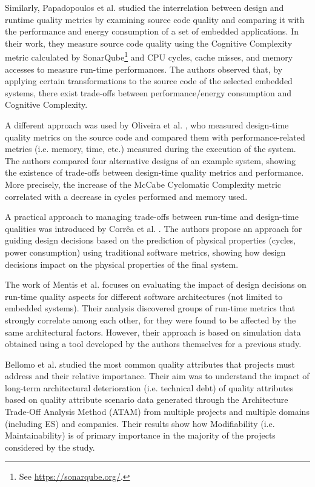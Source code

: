 Similarly, Papadopoulos et al. \cite{Papadopoulos2018} studied the interrelation between design and runtime quality metrics by examining source code quality and comparing it with the performance and energy consumption of a set of embedded applications.
In their work, they measure source code quality using the Cognitive Complexity metric calculated by SonarQube\footnote{See \url{https://sonarqube.org/}.} and CPU cycles, cache misses, and memory accesses to measure run-time performances.
The authors observed that, by applying certain transformations to the source code of the selected embedded systems, there exist trade-offs between performance/energy consumption and Cognitive Complexity.

A different approach was used by Oliveira et al. \cite{Oliveira2008}, who measured design-time quality metrics on the source code and compared them with performance-related metrics (i.e. memory, time, etc.) measured during the execution of the system.
The authors compared four alternative designs of an example system, showing the existence of trade-offs between design-time quality metrics and performance.
More precisely, the increase of the McCabe Cyclomatic Complexity metric correlated with a decrease in cycles performed and memory used.

A practical approach to managing trade-offs between run-time and design-time qualities was introduced by Corr{\^{e}}a et al. \cite{Correa2010}.
The authors propose an approach for guiding design decisions based on the prediction of physical properties (cycles, power consumption) using traditional software metrics, showing how design decisions impact on the physical properties of the final system.

The work of Mentis et al. \cite{Mentis2009} focuses on evaluating the impact of design decisions on run-time quality aspects for different software architectures (not limited to embedded systems).
Their analysis discovered groups of run-time metrics that strongly correlate among each other, for they were found to be affected by the same architectural factors.
However, their approach is based on simulation data obtained using a tool developed by the authors themselves for a previous study.

Bellomo et al. \cite{Bellomo2015} studied the most common quality attributes that projects must address and their relative importance. 
Their aim was to understand the impact of long-term architectural deterioration (i.e. technical debt) of quality attributes based on quality attribute scenario data generated through the Architecture Trade-Off Analysis Method (ATAM) from multiple projects and multiple domains (including ES) and companies.
Their results show how Modifiability (i.e. Maintainability) is of primary importance in the majority of the projects considered by the study.

